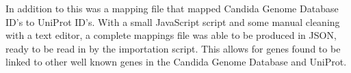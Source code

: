 In addition to this was a mapping file that mapped Candida Genome Database ID's to UniProt\cite{uniprot} ID's. With a small JavaScript script and some manual cleaning with a text editor, a complete mappings file was able to be produced in JSON, ready to be read in by the importation script. This allows for genes found to be linked to other well known genes in the Candida Genome Database and UniProt.
